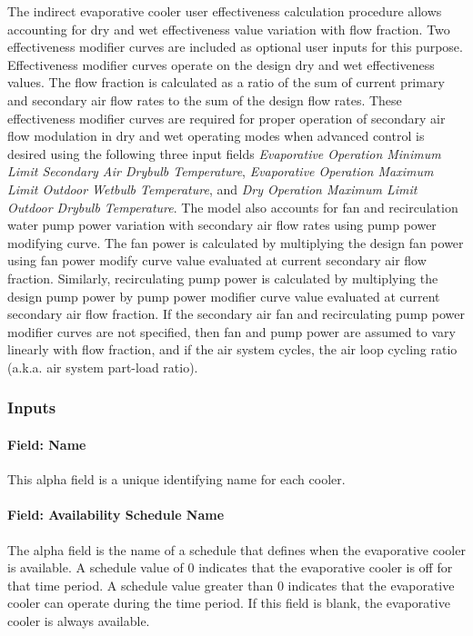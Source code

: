 The indirect evaporative cooler user effectiveness calculation procedure allows accounting for dry and wet effectiveness value variation with flow fraction. Two effectiveness modifier curves are included as optional user inputs for this purpose. Effectiveness modifier curves operate on the design dry and wet effectiveness values. The flow fraction is calculated as a ratio of the sum of current primary and secondary air flow rates to the sum of the design flow rates. These effectiveness modifier curves are required for proper operation of secondary air flow modulation in dry and wet operating modes when advanced control is desired using the following three input fields \textit{Evaporative Operation Minimum Limit Secondary Air Drybulb Temperature}, \textit{Evaporative Operation Maximum Limit Outdoor Wetbulb Temperature}, and \textit{Dry Operation Maximum Limit Outdoor Drybulb Temperature}. The model also accounts for fan and recirculation water pump power variation with secondary air flow rates using pump power modifying curve. The fan power is calculated by multiplying the design fan power using fan power modify curve value evaluated at current secondary air flow fraction. Similarly, recirculating pump power is calculated by multiplying the design pump power by pump power modifier curve value evaluated at current secondary air flow fraction. If the secondary air fan and recirculating pump power modifier curves are not specified, then fan and pump power are assumed to vary linearly with flow fraction, and if the air system cycles, the air loop cycling ratio (a.k.a. air system part-load ratio).

\subsubsection{Inputs}\label{inputs-4-011}

\paragraph{Field: Name}\label{field-name-4-010}

This alpha field is a unique identifying name for each cooler.

\paragraph{Field: Availability Schedule Name}\label{field-availability-schedule-name-1-004}

The alpha field is the name of a schedule that defines when the evaporative cooler is available. A schedule value of 0 indicates that the evaporative cooler is off for that time period. A schedule value greater than 0 indicates that the evaporative cooler can operate during the time period. If this field is blank, the evaporative cooler is always available.

